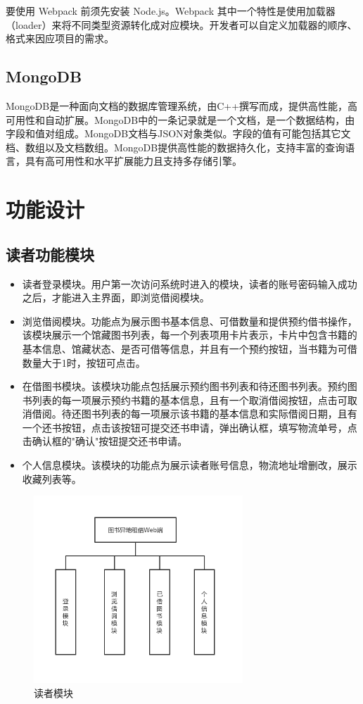 要使用 Webpack 前须先安装 Node.js。Webpack 其中一个特性是使用加载器（loader）来将不同类型资源转化成对应模块。开发者可以自定义加载器的顺序、格式来因应项目的需求。
\subsection{MongoDB}
MongoDB是一种面向文档的数据库管理系统，由C++撰写而成，提供高性能，高可用性和自动扩展。MongoDB中的一条记录就是一个文档，是一个数据结构，由字段和值对组成。MongoDB文档与JSON对象类似。字段的值有可能包括其它文档、数组以及文档数组。MongoDB提供高性能的数据持久化，支持丰富的查询语言，具有高可用性和水平扩展能力且支持多存储引擎。
\section{功能设计}
\subsection{读者功能模块}
\begin{itemize}
    \item 读者登录模块。用户第一次访问系统时进入的模块，读者的账号密码输入成功之后，才能进入主界面，即浏览借阅模块。
    \item 浏览借阅模块。功能点为展示图书基本信息、可借数量和提供预约借书操作，该模块展示一个馆藏图书列表，每一个列表项用卡片表示，卡片中包含书籍的基本信息、馆藏状态、是否可借等信息，并且有一个预约按钮，当书籍为可借数量大于1时，按钮可点击。
    \item 在借图书模块。该模块功能点包括展示预约图书列表和待还图书列表。预约图书列表的每一项展示预约书籍的基本信息，且有一个取消借阅按钮，点击可取消借阅。待还图书列表的每一项展示该书籍的基本信息和实际借阅日期，且有一个还书按钮，点击该按钮可提交还书申请，弹出确认框，填写物流单号，点击确认框的"确认"按钮提交还书申请。
    \item 个人信息模块。该模块的功能点为展示读者账号信息，物流地址增删改，展示收藏列表等。
\end{itemize}
\begin{figure}[H] %
    \centering %
    \includegraphics[width=0.7\textwidth]{./Chapters/images/reader_module.png} %
    \caption{读者模块} %
    \label{读者模块} %
\end{figure}


